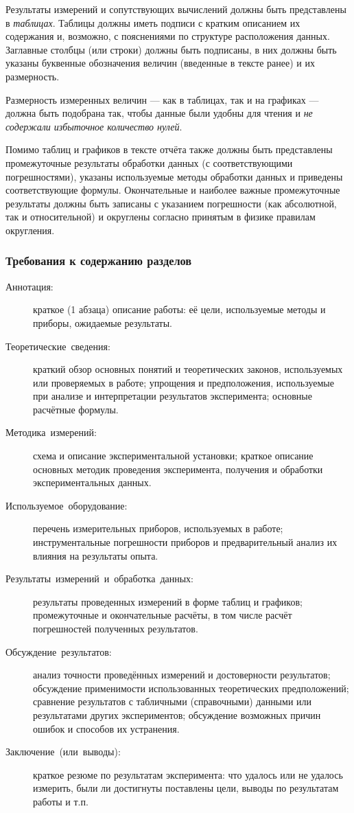 \documentclass[10pt]{article}
\begin{document}
Результаты измерений и сопутствующих вычислений должны быть представлены
в \emph{таблицах}. Таблицы должны иметь подписи с кратким описанием
их содержания и, возможно, с пояснениями по структуре расположения
данных. Заглавные столбцы (или строки) должны быть подписаны, в них
должны быть указаны буквенные обозначения величин (введенные в тексте
ранее) и их размерность. 

Размерность измеренных величин --- как в таблицах, так и
на графиках --- должна быть подобрана так, чтобы данные
были удобны для чтения и \emph{не содержали избыточное количество
нулей}.

Помимо таблиц и графиков в тексте отчёта также должны быть представлены
промежуточные результаты обработки данных (с соответствующими погрешностями),
указаны используемые методы обработки данных и приведены соответствующие
формулы. Окончательные и наиболее важные промежуточные результаты
должны быть записаны с указанием погрешности (как абсолютной, так
и относительной) и округлены согласно принятым в физике правилам округления.

\subsubsection*{Требования к содержанию разделов}
\begin{description}
\item [{Аннотация:}] краткое (1 абзаца) описание работы: её
цели, используемые методы и приборы, ожидаемые результаты.
\item [{Теоретические~сведения:}] краткий обзор основных понятий и теоретических
законов, используемых или проверяемых в работе; упрощения и предположения,
используемые при анализе и интерпретации результатов эксперимента;
основные расчётные формулы.
\item [{Методика~измерений:}] схема и описание экспериментальной установки;
краткое описание основных методик проведения эксперимента, получения
и обработки экспериментальных данных.
\item [{Используемое~оборудование:}] перечень измерительных приборов,
используемых в работе; инструментальные погрешности приборов и предварительный
анализ их влияния на результаты опыта.
\item [{Результаты~измерений~и~обработка~данных:}] результаты проведенных
измерений в форме таблиц и графиков; промежуточные и окончательные
расчёты, в том числе расчёт погрешностей полученных результатов.
\item [{Обсуждение~результатов:}] анализ точности проведённых измерений
и достоверности результатов; обсуждение применимости использованных
теоретических предположений; сравнение результатов с табличными (справочными)
данными или результатами других экспериментов; обсуждение возможных
причин ошибок и способов их устранения.
\item [{Заключение~(или~выводы):}] краткое резюме по результатам эксперимента:
что удалось или не удалось измерить, были ли достигнуты поставлены
цели, выводы по результатам работы и т.п.
\end{description}
\end{document}

